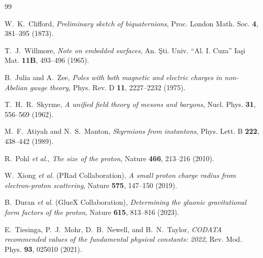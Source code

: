 \documentclass[11pt,a4paper]{article}
\theoremstyle{definition}
\theoremstyle{remark}
\begin{document}
\begin{thebibliography}{99}

W.~K.~Clifford, \textit{Preliminary sketch of biquaternions}, Proc. London Math. Soc. \textbf{4}, 381--395 (1873).

T.~J.~Willmore, \textit{Note on embedded surfaces}, An. {\c S}ti. Univ. ``Al. I. Cuza'' Ia{\c s}i Mat. \textbf{11B}, 493--496 (1965).

B.~Julia and A.~Zee, \textit{Poles with both magnetic and electric charges in non-Abelian gauge theory}, Phys. Rev. D \textbf{11}, 2227--2232 (1975).

T.~H.~R.~Skyrme, \textit{A unified field theory of mesons and baryons}, Nucl. Phys. \textbf{31}, 556--569 (1962).

M.~F.~Atiyah and N.~S.~Manton, \textit{Skyrmions from instantons}, Phys. Lett. B \textbf{222}, 438--442 (1989).

R.~Pohl \textit{et al.}, \textit{The size of the proton}, Nature \textbf{466}, 213--216 (2010).

W.~Xiong \textit{et al.} (PRad Collaboration), \textit{A small proton charge radius from electron-proton scattering}, Nature \textbf{575}, 147--150 (2019).

B.~Duran \textit{et al.} (GlueX Collaboration), \textit{Determining the gluonic gravitational form factors of the proton}, Nature \textbf{615}, 813--816 (2023).

E.~Tiesinga, P.~J.~Mohr, D.~B.~Newell, and B.~N.~Taylor, \textit{CODATA recommended values of the fundamental physical constants: 2022}, Rev. Mod. Phys. \textbf{93}, 025010 (2021).

\end{thebibliography}
\end{document}
